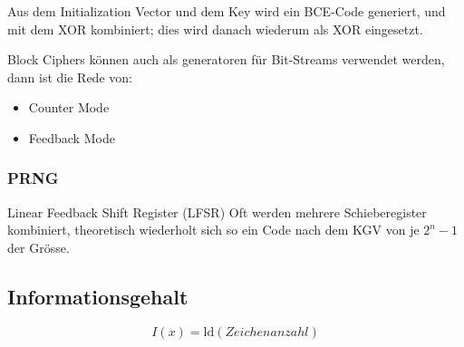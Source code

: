 Aus dem Initialization Vector und dem Key wird ein BCE-Code generiert, und mit dem XOR kombiniert; dies wird danach wiederum als XOR eingesetzt.


Block Ciphers können auch als generatoren für Bit-Streams verwendet werden, dann ist die Rede von:
\begin{itemize}
	\item Counter Mode
	\item Feedback Mode
\end{itemize}

\subsubsection{PRNG}
Linear Feedback Shift Register (LFSR)
Oft werden mehrere Schieberegister kombiniert, theoretisch wiederholt sich so ein Code nach dem KGV von je $2^n-1$ der Grösse.

\subsection{Informationsgehalt}

\[
	I(x) = \mathrm{ld} \left(Zeichenanzahl \right)
\]

